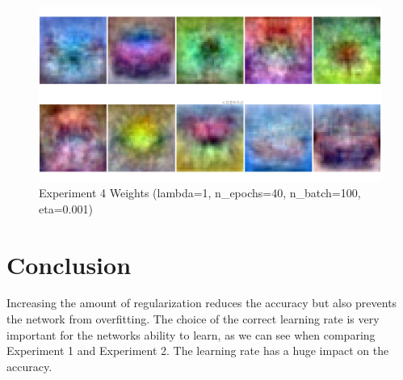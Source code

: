     \begin{figure}[ht]
        \includegraphics[width=\textwidth]{../code/result_pics/lambda=1, n_epochs=40, n_batch=100, eta=.001/weights.png}
        \caption{Experiment 4 Weights (lambda=1, n\_epochs=40, n\_batch=100, eta=0.001)}
        \label{fig:weights4}
    \end{figure}

\clearpage

\section{Conclusion}
Increasing the amount of regularization reduces the accuracy but also prevents the network from overfitting. The choice of the correct
learning rate is very important for the networks ability to learn, as we can see when comparing Experiment 1 and Experiment 2. The learning rate
has a huge impact on the accuracy.